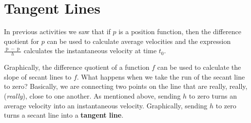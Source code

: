 \documentclass[12pt,]{book}
\newcommand{\terminology}[1]{\textbf{#1}}
\theoremstyle{plain}
\theoremstyle{definition}
\numberwithin{equation}{section}
\newcommand{\fe}[2]{\mathop{{#1}{\left(#2\right)}}}
\begin{document}
\section[Tangent Lines]{Tangent Lines}\label{section-tangent-lines}
In previous activities we saw that if \(p\) is a position function, then the difference quotient for \(p\) can be used to calculate average velocities and the expression \(\frac{\fe{p}{t_0+h}-\fe{p}{t_0}}{h}\) calculates the instantaneous velocity at time \(t_0\).%
\par
Graphically, the difference quotient of a function \(f\) can be used to calculate the slope of secant lines to \(f\). What happens when we take the run of the secant line to zero? Basically, we are connecting two points on the line that are really, really, (\emph{really}), close to one another. As mentioned above, sending \(h\) to zero turns an average velocity into an instantaneous velocity. Graphically, sending \(h\) to zero turns a secant line into a \terminology{tangent line}.%
\end{document}
